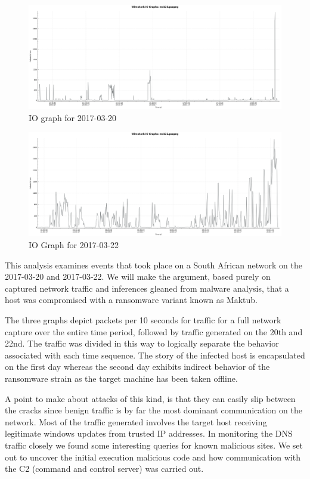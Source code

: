 \documentclass[11pt]{diazessay} %
\begin{document}
\begin{figure}[H]
        \centering
        \includegraphics[scale=0.30]{mak20.png}
    \caption{IO graph for 2017-03-20} 
\end{figure}

\begin{figure}[H]
        \centering
        \includegraphics[scale=0.30]{mak22.png}
    \caption{IO Graph for 2017-03-22}
\end{figure}

This analysis examines events that took place on a South African network on the 2017-03-20 and 2017-03-22. We will make the argument, based purely on captured network traffic and inferences gleaned from malware analysis, that a host was compromised with a ransomware variant known as Maktub. 

The three graphs depict packets per 10 seconds for traffic for a full network capture over the entire time period, followed by traffic generated on the 20th and 22nd. The traffic was divided in this way to logically separate the behavior associated with each time sequence. The story of the infected host is encapsulated on the first day whereas the second day exhibits indirect behavior of the ransomware strain as the target machine has been taken offline.  

A point to make about attacks of this kind, is that they can easily slip between the cracks since benign traffic is by far the most dominant communication on the network. Most of the traffic generated involves the target host receiving legitimate windows updates from trusted IP addresses. In monitoring the DNS traffic closely we found some interesting queries for known malicious sites. We set out to uncover the initial execution malicious code and how communication with the C2 (command and control server) was carried out.
\end{document}
